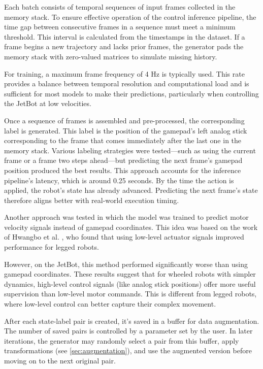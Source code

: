 Each batch consists of temporal sequences of input frames collected in the memory stack. To ensure effective operation of the control inference pipeline, the time gap between consecutive frames in a sequence must meet a minimum threshold. This interval is calculated from the timestamps in the dataset. If a frame begins a new trajectory and lacks prior frames, the generator pads the memory stack with zero-valued matrices to simulate missing history.

For training, a maximum frame frequency of 4 Hz is typically used. This rate provides a balance between temporal resolution and computational load and is sufficient for most models to make their predictions, particularly when controlling the JetBot at low velocities.

Once a sequence of frames is assembled and pre-processed, the corresponding label is generated. This label is the position of the gamepad’s left analog stick corresponding to the frame that comes immediately after the last one in the memory stack. Various labeling strategies were tested—such as using the current frame or a frame two steps ahead—but predicting the next frame’s gamepad position produced the best results. This approach accounts for the inference pipeline’s latency, which is around 0.25 seconds. By the time the action is applied, the robot’s state has already advanced. Predicting the next frame’s state therefore aligns better with real-world execution timing.

Another approach was tested in which the model was trained to predict motor velocity signals instead of gamepad coordinates. This idea was based on the work of Hwangbo et al. \autocite{hwangbo2019learning}, who found that using low-level actuator signals improved performance for legged robots.

However, on the JetBot, this method performed significantly worse than using gamepad coordinates. These results suggest that for wheeled robots with simpler dynamics, high-level control signals (like analog stick positions) offer more useful supervision than low-level motor commands. This is different from legged robots, where low-level control can better capture their complex movement.

After each state-label pair is created, it’s saved in a buffer for data augmentation. The number of saved pairs is controlled by a parameter set by the user. In later iterations, the generator may randomly select a pair from this buffer, apply transformations (see \autoref{sec:augmentation}), and use the augmented version before moving on to the next original pair.

